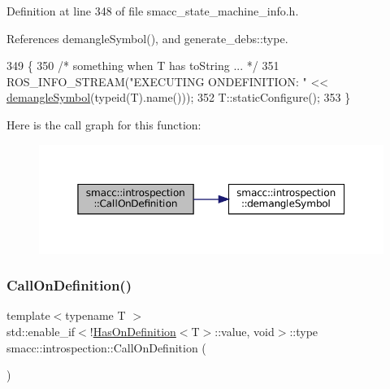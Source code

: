 Definition at line 348 of file smacc\+\_\+state\+\_\+machine\+\_\+info.\+h.



References demangle\+Symbol(), and generate\+\_\+debs\+::type.


\begin{DoxyCode}
349 \{
350     \textcolor{comment}{/* something when T has toString ... */}
351     ROS\_INFO\_STREAM(\textcolor{stringliteral}{"EXECUTING ONDEFINITION: "} << \hyperlink{namespacesmacc_1_1introspection_a2f495108db3e57604d8d3ff5ef030302}{demangleSymbol}(\textcolor{keyword}{typeid}(T).name()));
352     T::staticConfigure();
353 \}
\end{DoxyCode}
Here is the call graph for this function\+:
\nopagebreak
\begin{figure}[H]
\begin{center}
\leavevmode
\includegraphics[width=350pt]{namespacesmacc_1_1introspection_a14a28bfad794e98164dce1375d3b0796_cgraph}
\end{center}
\end{figure}
\mbox{\label{namespacesmacc_1_1introspection_a8cfcfc9c8896a6ff4bf22dbce6ecf838}} 
\subsubsection{\texorpdfstring{Call\+On\+Definition()}{CallOnDefinition()}\hspace{0.1cm}{\footnotesize\ttfamily [2/2]}}
{\footnotesize\ttfamily template$<$typename T $>$ \\
std\+::enable\+\_\+if$<$!\hyperlink{classsmacc_1_1introspection_1_1HasOnDefinition}{Has\+On\+Definition}$<$T$>$\+::value, void$>$\+::type smacc\+::introspection\+::\+Call\+On\+Definition (\begin{DoxyParamCaption}{ }\end{DoxyParamCaption})}



